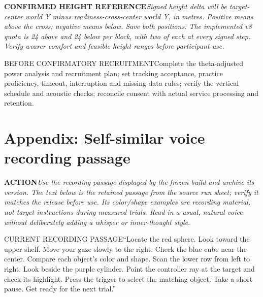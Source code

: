 \documentclass[11pt,letterpaper]{article}
\newcommand{\step}[1]{\Needspace{7\baselineskip}\section{#1}}
\newcommand{\action}[2]{\Needspace{3\baselineskip}\par{\color{ActionInk}\textbf{#1}\enspace\textit{#2}}\par}
\newcommand{\meeting}[2]{\Needspace{7\baselineskip}\begin{meetingnote}{#1}#2\end{meetingnote}}
\begin{document}
\action{CONFIRMED HEIGHT REFERENCE}{Signed height delta will be target-center world Y minus readiness-cross-center world Y, in metres. Positive means above the cross; negative means below. Save both positions. The implemented v8 quota is 24 above and 24 below per block, with two of each at every signed step. Verify wearer comfort and feasible height ranges before participant use.}
\meeting{BEFORE CONFIRMATORY RECRUITMENT}{Complete the theta-adjusted power analysis and recruitment plan; set tracking acceptance, practice proficiency, timeout, interruption and missing-data rules; verify the vertical schedule and acoustic checks; reconcile consent with actual service processing and retention.}
\clearpage

\step{Appendix: Self-similar voice recording passage}
\action{ACTION}{Use the recording passage displayed by the frozen build and archive its version. The text below is the retained passage from the source run sheet; verify it matches the release before use. Its color/shape examples are recording material, not target instructions during measured trials. Read in a usual, natural voice without deliberately adding a whisper or inner-thought style.}
\meeting{CURRENT RECORDING PASSAGE}{``Locate the red sphere. Look toward the upper shelf. Move your gaze slowly to the right. Check the blue cube near the center. Compare each object's color and shape. Scan the lower row from left to right. Look beside the purple cylinder. Point the controller ray at the target and check its highlight. Press the trigger to select the matching object. Take a short pause. Get ready for the next trial.''}
\end{document}

